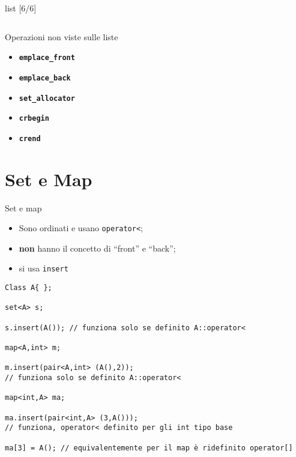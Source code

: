 \documentclass[xcolor={dvipsnames, svgnames, x11names, table}, 10pt]{beamer}
\begin{document}
\begin{frame}[t, fragile]{list [6/6]}

\begin{columns}
    

    
\end{columns}

\end{frame}

\begin{frame}{Operazioni non viste sulle liste}
    
    \begin{itemize}
        \item \textbf{\texttt{emplace\_front}}
        \item \textbf{\texttt{emplace\_back}}
        \item \textbf{\texttt{set\_allocator}}
        \item \textbf{\texttt{crbegin}}
        \item \textbf{\texttt{crend}}
    \end{itemize}
    
\end{frame}

\section{Set e Map}

\begin{frame}[t, fragile]{Set e map}

\begin{itemize}
    \item Sono ordinati e usano \texttt{operator<};
    \item \textbf{non} hanno il concetto di \enquote{front} e \enquote{back};
    \item si usa \texttt{insert}
\end{itemize}

\begin{verbatim}
Class A{ };

set<A> s;

s.insert(A()); // funziona solo se definito A::operator<

map<A,int> m;

m.insert(pair<A,int> (A(),2));
// funziona solo se definito A::operator<

map<int,A> ma;

ma.insert(pair<int,A> (3,A()));
// funziona, operator< definito per gli int tipo base

ma[3] = A(); // equivalentemente per il map è ridefinito operator[]
\end{verbatim}

\end{frame}
\end{document}
